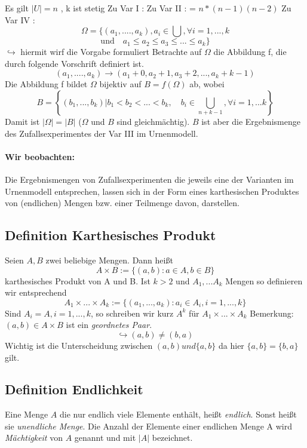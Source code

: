 \documentclass[12pt,a4paper]{article}
\newcommand{\newpara}{\vskip 0.5cm}
\begin{document}
\newpage
	Es gilt $|U| = n$ , k ist stetig
	Zu Var I : \newline
	 \newline
	Zu Var II : \newline
	 = $n*(n-1)(n-2)$ \newline
	Zu Var IV : \newline
	$$\Omega=\{(a_1,....,a_k), a_i\in\bigcup, \forall i=1,...,k$$
	$$\text{und} \quad a_1\leq a_2 \leq a_3 \leq ... \leq a_k\}$$
	$\hookrightarrow$ hiermit wirf die Vorgabe  formuliert \newline
	Betrachte auf $\Omega$ die Abbildung f, die durch folgende Vorschrift definiert ist.
	$$(a_1,....,a_k)\rightarrow(a_1+0,a_2+1,a_3+2,...,a_k+k-1)$$
	Die Abbildung f bildet $\Omega$ bijektiv auf $B = f(\Omega)$ ab, wobei
	$$B=\left\{(b_1,...,b_k)|b_1<b_2<...<b_k, \quad b_i\in\bigcup_{n+k-1},\forall i=1,...k\right\}$$
	Damit ist $|\Omega| = |B|$ ($\Omega$ und $B$ sind gleichmächtig). $B$ ist aber die Ergebnismenge des 
	Zufallsexperimentes der Var III im Urnenmodell.
	\paragraph{Wir beobachten: }
	Die Ergebnismengen von Zufallsexperimenten die jeweils eine der Varianten im 
	Urnenmodell entsprechen, lassen sich in der Form eines karthesischen Produktes von (endlichen) Mengen bzw.
	einer Teilmenge davon, darstellen.
\newpara
	\subsection{Definition Karthesisches Produkt}
		Seien $A,B$ zwei beliebige Mengen. Dann heißt
		$$A\times B :=\{(a,b):a\in A, b\in B\}$$
		karthesisches Produkt von A und B. Ist $k>2$ und $A_1,...A_k$ Mengen so definieren wir entsprechend
		$$A_1\times ... \times A_k :=\{(a_1,...,a_k):a_i\in A_i,i=1,...,k\}$$
		Sind $A_i=A,i=1,...,k$, so schreiben wir kurz $A^k$ für $A_1\times ... \times A_k$
		Bemerkung: \newline
		$(a,b)\in A\times B$ ist ein \textit{geordnetes Paar}.
		$$\hookrightarrow (a,b) \neq  (b,a)$$
		Wichtig ist die Unterscheidung zwischen $(a,b) und \{a,b\}$ da hier $\{a,b\}=\{b,a\}$ gilt.
\newpara
	\subsection{Definition Endlichkeit}
	Eine Menge $A$ die nur endlich viele Elemente enthält, heißt \textit{endlich}. Sonst heißt sie
	\textit{unendliche Menge}. Die Anzahl der Elemente einer endlichen Menge A wird \textit{Mächtigkeit} von
	$A$ genannt und mit $|A|$ bezeichnet.
\newpara
\end{document}
